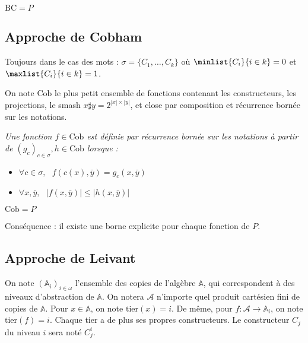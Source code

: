 \documentclass{article}
\newcommand{\bbA}{\mathbb{A}}
\begin{document}
		
		\begin{theorem}
			$\text{BC} = P$
		\end{theorem}
		
		
		\subsection{Approche de Cobham}
		
			
		Toujours dans le cas des mots : $\sigma = \{ C_1, \dots, C_k \}$ où $\minlist{C_i}{i \in k} = 0$ et $\maxlist{C_i}{i \in k} = 1$.
		
		
		\begin{definition}
			On note $\text{Cob}$ le plus petit ensemble de fonctions contenant les constructeurs, les projections, le smash $x \sharp y = 2^{\left| x \right| \times \left| y\right|}$, et close par composition et récurrence bornée sur les notations.
			
			
			\emph{Une fonction $f \in \text{Cob}$ est définie par récurrence bornée sur les notations à partir de $(g_c)_{c \in \sigma}, h \in \text{Cob}$ lorsque :}
			
			\begin{itemize}
				\setlength{\itemsep}{-1mm}
				\item 	$\forall c \in \sigma, \:\:\: f\left( c(x), \bar{y} \right) = g_c\left( x, \bar{y} \right)$
				\item 	$\forall x, \bar{y}, \:\:\: \left| f \left( x, \bar{y} \right) \right| \leq \left| h \left( x, \bar{y} \right) \right|$
			\end{itemize}
			
		\end{definition}
		
		
		\begin{theorem}[Cobham]
			$\text{Cob} = P$
		\end{theorem}
			
		Conséquence : il existe une borne explicite pour chaque fonction de $P$. 
		
		
		
		\subsection{Approche de Leivant}
	
		
		On note $(\bbA_i)_{i\in \omega}$ l'ensemble des copies de l'algèbre $\bbA$, qui correspondent à des niveaux d'abstraction de $\bbA$. On notera $\mathcal{A}$ n'importe quel produit cartésien fini de copies de $\bbA$. Pour $x\in \bbA$, on note $\text{tier}(x) = i$. De même, pour $f : \mathcal{A} \to \bbA_i$, on note $\text{tier}(f) = i$. Chaque tier a de plus ses propres constructeurs. Le constructeur $C_j$ du niveau $i$ sera noté $C_j^i$. 
		
\end{document}
